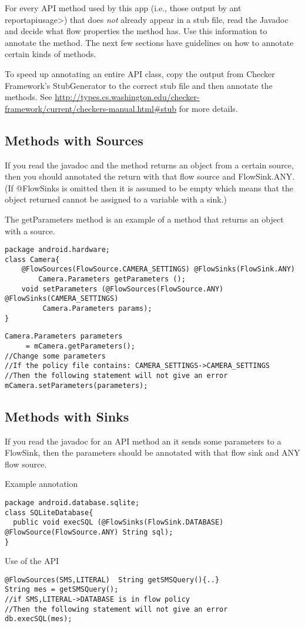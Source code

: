 For every API method used by this app (i.e., those output by \<ant
reportapiusage>) that does \emph{not} already appear in a stub file, read the Javadoc and decide what flow properties the method
has.  Use this information to annotate the method.  The next few sections have guidelines on
how to annotate certain kinds of methods. 

To speed up annotating an entire API class, copy the output from Checker Framework's StubGenerator to 
the correct stub file and then annotate the methods.  See \url{http://types.cs.washington.edu/checker-framework/current/checkers-manual.html#stub} for more details. 

\subsection{Methods with Sources}
If you read the javadoc and the method returns an object from a certain source, then you should annotated 
the return with that flow source and FlowSink.ANY. (If  @FlowSinks is omitted then it is assumed to be empty
 which means that the object returned cannot be assigned to a variable with a sink.)

The getParameters method is an example of a method that returns an object with a source.
\begin{Verbatim}
package android.hardware;
class Camera{
    @FlowSources(FlowSource.CAMERA_SETTINGS) @FlowSinks(FlowSink.ANY)
        Camera.Parameters getParameters ();
    void setParameters (@FlowSources(FlowSource.ANY) @FlowSinks(CAMERA_SETTINGS) 
         Camera.Parameters params);
}
\end{Verbatim}

\begin{Verbatim}
Camera.Parameters parameters
     = mCamera.getParameters();
//Change some parameters
//If the policy file contains: CAMERA_SETTINGS->CAMERA_SETTINGS
//Then the following statement will not give an error
mCamera.setParameters(parameters);
\end{Verbatim}



\subsection{Methods with Sinks}
If you read the javadoc for an API method an it sends some parameters to a FlowSink, then the parameters
should be annotated with that flow sink and ANY flow source.  

Example annotation
\begin{Verbatim}
package android.database.sqlite;
class SQLiteDatabase{
  public void execSQL (@FlowSinks(FlowSink.DATABASE) @FlowSource(FlowSource.ANY) String sql);
}
\end{Verbatim}
Use of the API
\begin{Verbatim}
@FlowSources(SMS,LITERAL)  String getSMSQuery(){..}
String mes = getSMSQuery();
//if SMS,LITERAL->DATABASE is in flow policy
//Then the following statement will not give an error
db.execSQL(mes);
\end{Verbatim}

